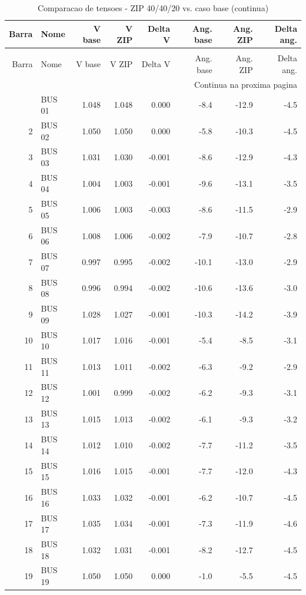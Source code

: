 \documentclass[12pt]{classe_uftex/uftex}
\begin{document}
\scriptsize
\begin{longtable}{rlrrrrrr}
\caption{Comparacao de tensoes - ZIP 40/40/20 vs. caso base}\label{tab:tensoes-zip-base}\\
\toprule
Barra & Nome & V base & V ZIP & Delta V & Ang. base & Ang. ZIP & Delta ang. \\
\midrule
\endfirsthead
\caption[]{Comparacao de tensoes - ZIP 40/40/20 vs. caso base (continua)}\\
\toprule
Barra & Nome & V base & V ZIP & Delta V & Ang. base & Ang. ZIP & Delta ang. \\
\midrule
\endhead
\midrule
\multicolumn{8}{r}{Continua na proxima pagina}\\
\endfoot
\bottomrule
\endlastfoot
1 & BUS 01 & 1.048 & 1.048 & 0.000 & -8.4 & -12.9 & -4.5 \\
2 & BUS 02 & 1.050 & 1.050 & 0.000 & -5.8 & -10.3 & -4.5 \\
3 & BUS 03 & 1.031 & 1.030 & -0.001 & -8.6 & -12.9 & -4.3 \\
4 & BUS 04 & 1.004 & 1.003 & -0.001 & -9.6 & -13.1 & -3.5 \\
5 & BUS 05 & 1.006 & 1.003 & -0.003 & -8.6 & -11.5 & -2.9 \\
6 & BUS 06 & 1.008 & 1.006 & -0.002 & -7.9 & -10.7 & -2.8 \\
7 & BUS 07 & 0.997 & 0.995 & -0.002 & -10.1 & -13.0 & -2.9 \\
8 & BUS 08 & 0.996 & 0.994 & -0.002 & -10.6 & -13.6 & -3.0 \\
9 & BUS 09 & 1.028 & 1.027 & -0.001 & -10.3 & -14.2 & -3.9 \\
10 & BUS 10 & 1.017 & 1.016 & -0.001 & -5.4 & -8.5 & -3.1 \\
11 & BUS 11 & 1.013 & 1.011 & -0.002 & -6.3 & -9.2 & -2.9 \\
12 & BUS 12 & 1.001 & 0.999 & -0.002 & -6.2 & -9.3 & -3.1 \\
13 & BUS 13 & 1.015 & 1.013 & -0.002 & -6.1 & -9.3 & -3.2 \\
14 & BUS 14 & 1.012 & 1.010 & -0.002 & -7.7 & -11.2 & -3.5 \\
15 & BUS 15 & 1.016 & 1.015 & -0.001 & -7.7 & -12.0 & -4.3 \\
16 & BUS 16 & 1.033 & 1.032 & -0.001 & -6.2 & -10.7 & -4.5 \\
17 & BUS 17 & 1.035 & 1.034 & -0.001 & -7.3 & -11.9 & -4.6 \\
18 & BUS 18 & 1.032 & 1.031 & -0.001 & -8.2 & -12.7 & -4.5 \\
19 & BUS 19 & 1.050 & 1.050 & 0.000 & -1.0 & -5.5 & -4.5 \\

\end{longtable}
\end{document}
